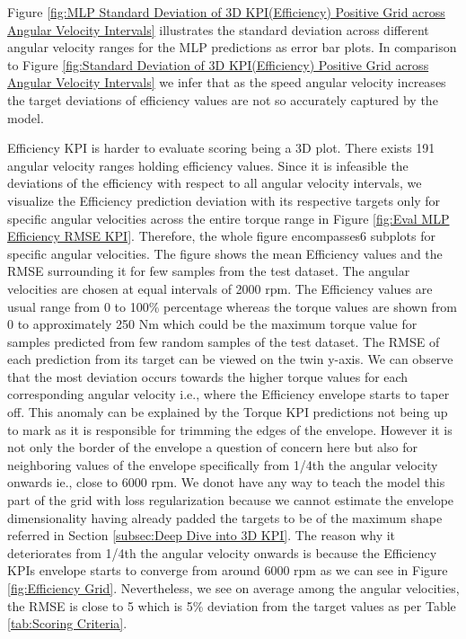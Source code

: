 \documentclass{report} %
\begin{document}
Figure \ref{fig:MLP Standard Deviation of 3D KPI(Efficiency) Positive Grid across Angular Velocity Intervals} illustrates the standard deviation across different 
angular velocity ranges for the \ac{MLP} predictions as error bar plots.
In comparison to Figure \ref{fig:Standard Deviation of 3D KPI(Efficiency) Positive Grid across Angular Velocity Intervals} we infer that as the speed angular 
velocity increases the target deviations of efficiency values are not so accurately captured by the model.

Efficiency \ac{KPI} is harder to evaluate scoring being a 3\ac{D} plot. There exists 191 angular velocity ranges holding efficiency values.
Since it is infeasible the deviations of the efficiency with respect to all angular velocity intervals, we visualize the Efficiency prediction deviation 
with its respective targets only for specific angular velocities across the entire torque range in Figure \ref{fig:Eval MLP Efficiency RMSE KPI}. Therefore, the 
whole figure encompasses6 subplots for specific angular velocities.
The figure shows the mean Efficiency values and the \ac{RMSE} surrounding it for few samples from the test dataset.
The angular velocities are chosen at equal intervals of 2000 rpm. The Efficiency values are usual range from 0 to 100\% percentage whereas the torque values are shown 
from 0 to approximately 250 Nm which could be the maximum torque value for samples predicted from few random samples of the test dataset.
The \ac{RMSE} of each prediction from its target can be viewed on the twin y-axis.
We can observe that the most deviation occurs towards the higher torque values for each corresponding angular velocity i.e., where the Efficiency envelope starts to taper off.
This anomaly can be explained by the Torque \ac{KPI} predictions not being up to mark as it is responsible for trimming the edges of the envelope.
However it is not only the border of the envelope a question of concern here but also for neighboring values of the envelope specifically from 1/4th the 
angular velocity onwards ie., close to 6000 rpm. 
We donot have any way to teach the model this part of the grid with loss regularization because we cannot estimate the envelope dimensionality having already padded 
the targets to be of the maximum shape referred in Section \ref{subsec:Deep Dive into 3D KPI}. The reason why it deteriorates from 1/4th the angular velocity onwards is 
because the Efficiency \ac{KPI}s envelope starts to converge from around 6000 rpm as we can see in Figure \ref{fig:Efficiency Grid}.
Nevertheless, we see on average among the angular velocities, the \ac{RMSE} is close to 5 which is 5\% deviation from the target values as per Table \ref{tab:Scoring Criteria}.
\end{document}
